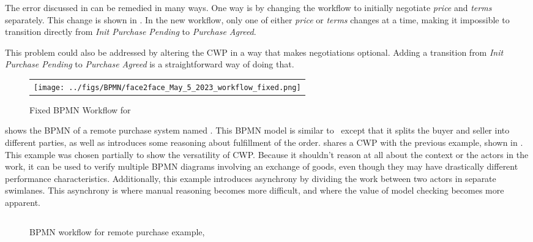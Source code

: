 The error discussed in  can be remedied in many ways. One way is by changing the workflow to initially negotiate \emph{price} and \emph{terms} separately. This change is shown in . In the new workflow, only one of either \emph{price} or \emph{terms} changes at a time, making it impossible to transition directly from \emph{Init Purchase Pending} to \emph{Purchase Agreed}.

This problem could also be addressed by altering the CWP in a way that makes negotiations optional. Adding a transition from \emph{Init Purchase Pending} to \emph{Purchase Agreed} is a straightforward way of doing that.

\begin{figure*}[t]
  \begin{center}
    \begin{tabular}{c}
        \texttt{[image: ../figs/BPMN/face2face\_May\_5\_2023\_workflow\_fixed.png]}
    \end{tabular}
  \end{center}
\caption{Fixed BPMN Workflow for \facetoface}
\label{fig:face2face_workflow_fixed}
\end{figure*}

 shows the BPMN of a remote purchase system named \buynsell. This BPMN model is similar to \facetoface~except that it splits the buyer and seller into different parties, as well as introduces some reasoning about fulfillment of the order. \buynsell shares a CWP with the previous example, shown in . This example was chosen partially to show the versatility of CWP. Because it shouldn't reason at all about the context or the actors in the work, it can be used to verify multiple BPMN diagrams involving an exchange of goods, even though they may have drastically different performance characteristics. Additionally, this example introduces asynchrony by dividing the work between two actors in separate swimlanes. This asynchrony is where manual reasoning becomes more difficult, and where the value of model checking becomes more apparent.

\begin{figure*}[t]
  \begin{center}
    \begin{tabular}{c}
        
    \end{tabular}
  \end{center}
\caption{BPMN workflow for remote purchase example, \buynsell}
\label{fig:buynsell_bpmn}
\end{figure*}

